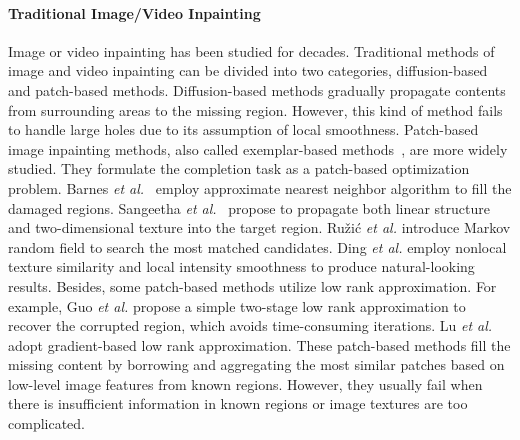 \paragraph{Traditional Image/Video Inpainting} Image or video inpainting has been studied for decades. 
%
Traditional methods of image and video inpainting can be divided into two categories, diffusion-based and patch-based methods. 
Diffusion-based methods \cite{bertalmio2000image,ballester2001filling,sridevi2019image} gradually propagate contents from surrounding areas to the missing region. 
%
However, this kind of method fails to handle large holes due to its assumption of local smoothness. 
%
Patch-based image inpainting methods, also called exemplar-based methods~\cite{bertalmio2003simultaneous,efros2001image,li2008patch,zhang2014image}, are more widely studied.
They formulate the completion task as a patch-based optimization problem. 
Barnes \emph{et al.}~\cite{barnes2009patchmatch} employ approximate nearest neighbor algorithm to fill the damaged regions.
Sangeetha \emph{et al.}~\cite{sangeetha2011combined} propose to propagate both linear structure and two-dimensional texture into the target region.
Ru{\v{z}}i{\'c} \emph{et al.} \cite{ruvzic2014context} introduce Markov random field to search the most matched candidates.
Ding \emph{et al.} \cite{ding_19nonlocal} employ nonlocal texture similarity and local intensity smoothness to produce natural-looking results.
Besides, some patch-based methods utilize low rank approximation. For example, Guo \emph{et al.} \cite{pb_lowrank2018} propose a simple two-stage low rank approximation to recover the corrupted region, which avoids time-consuming iterations.
Lu \emph{et al.} \cite{lu2018gradient} adopt gradient-based low rank approximation.
These patch-based methods fill the missing content by borrowing and aggregating the most similar patches based on low-level image features from known regions. However, they usually fail when there is insufficient information in known regions or image textures are too complicated.  
%

